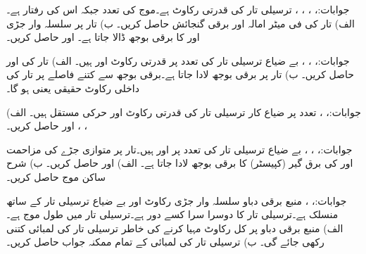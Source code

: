جوابات:، ، ، ، 
ترسیلی تار کی قدرتی رکاوٹ  ہے۔موج کی تعدد  جبکہ اس کی رفتار  ہے۔ الف) تار کی فی میٹر امالہ اور برقی گنجائش حاصل کریں۔ ب) تار پر سلسلہ وار جڑی  اور  کا برقی بوجھ ڈالا جاتا ہے۔  اور  حاصل کریں۔

جوابات:، ، ، 
بے ضیاع ترسیلی تار کی  تعدد پر قدرتی رکاوٹ  اور  ہیں۔ الف) تار کی  اور  حاصل کریں۔ ب) تار پر  برقی بوجھ لادا جاتا ہے۔برقی بوجھ سے کتنے فاصلے پر تار کی داخلی رکاوٹ  حقیقی  یعنی  ہو گا۔

جوابات:، ،  
تعدد  پر ضیاع کار ترسیلی تار کی قدرتی رکاوٹ   اور حرکی مستقل  ہیں۔ الف) ، ،  اور  حاصل کریں۔

جوابات:، ، ، 
بے ضیاع ترسیلی تار کی  تعدد پر  اور  ہیں۔تار پر متوازی جڑے  کی مزاحمت اور  کی برق گیر (کپیسٹر)  کا برقی بوجھ لادا جاتا ہے۔ الف)  اور  حاصل کریں۔ ب) شرح ساکن موج حاصل کریں۔

جوابات:، ، 
منبع برقی دباو سلسلہ وار جڑی رکاوٹ  اور بے ضیاع ترسیلی تار کے ساتھ منسلک ہے۔ترسیلی تار کا دوسرا سرا کسے دور ہے۔ترسیلی تار میں طول موج  ہے۔ الف) منبع برقی دباو پر کل  رکاوٹ مہیا کرنے کی خاطر ترسیلی تار کی لمبائی کتنی رکھی جائے گی۔ ب) ترسیلی تار کی لمبائی کے  تمام ممکنہ جواب حاصل کریں۔

